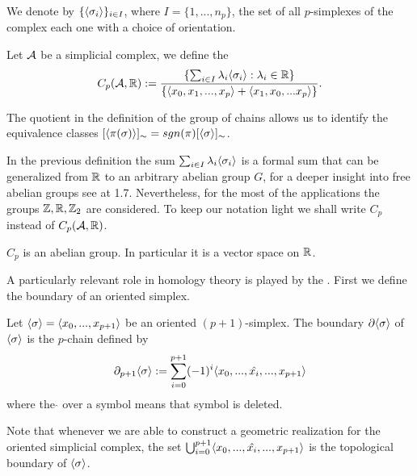 \documentclass[../1.tex]{subfiles}
\begin{document}
    We denote by $\{\langle \sigma_i \rangle\}_{i \in I}$, where $I = \{1,...,n_p\}$, the set of all $p$-simplexes of the complex each one with a choice
    of orientation.

    \begin{defn}
        Let $\mathcal{A}$ be a simplicial complex, we define the  
        \[ C_p(\mathcal{A},\mathbb{R}) := \frac{\{ \sum_{i \in I} \lambda_i \langle \sigma_i \rangle : \lambda_i \in \mathbb{R} \}}{\{\langle x_0,x_1,...,x_p \rangle+\langle x_1,x_0,...x_p \rangle\} }.\]
    \end{defn}

    \begin{rem}
        The quotient in the definition of the group of chains allows us to identify the equivalence classes $[\langle \pi(\sigma) \rangle]_\sim=sgn(\pi)[\langle \sigma \rangle]_\sim$.
    \end{rem}

    In the previous definition the sum $\sum_{i \in I} \lambda_i \langle \sigma_i \rangle$ is a formal sum that can be generalized from $\mathbb{R}$ to an arbitrary abelian group $G$, for a deeper insight into free abelian groups see \cite{lang} at 1.7.
    Nevertheless, for the most of the applications the groups $\mathbb{Z},\mathbb{R},\mathbb{Z}_2$ are considered. To keep our notation light we shall write $C_p$ instead of $C_p(\mathcal{A},\mathbb{R})$.
    
    \begin{prop}
        $C_p$ is an abelian group.
        In particular it is a vector space on $\mathbb{R}$.
    \end{prop}

    A particularly relevant role in homology theory is played by the . First we define the boundary of an oriented simplex.

    \begin{defn}
        Let $\langle \sigma \rangle = \langle x_0,...,x_{p+1} \rangle$ be an oriented $(p+1)$-simplex. The boundary $\partial\langle \sigma \rangle$ of $\langle \sigma \rangle$ is the $p$-chain
        defined by \[ \partial_{p+1}\langle \sigma \rangle := \sum_{i = 0}^{p+1}(-1)^i\langle x_0,...,\hat{x_i},...,x_{p+1} \rangle\]
        where the  $\hat{}$  over a symbol means that symbol is deleted.
    \end{defn}

    \begin{rem}
        Note that whenever we are able to construct a geometric realization for the oriented simplicial complex, the set $\bigcup_{i = 0}^{p+1}\langle x_0,...,\hat{x_i},...,x_{p+1} \rangle$
        is the topological boundary of $\langle \sigma \rangle$.
    \end{rem}
\end{document}
